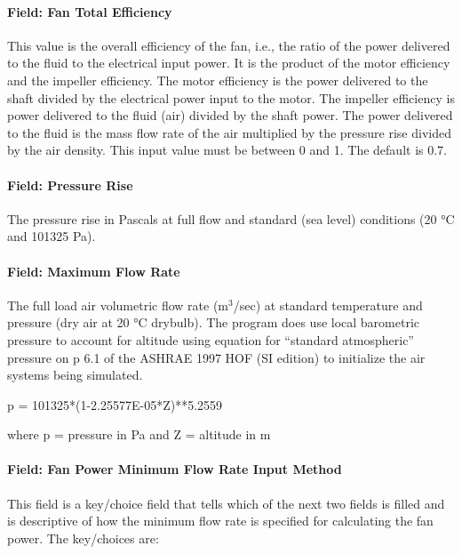 \paragraph{Field: Fan Total Efficiency}\label{field-fan-total-efficiency-2}

This value is the overall efficiency of the fan, i.e., the ratio of the power delivered to the fluid to the electrical input power. It is the product of the motor efficiency and the impeller efficiency. The motor efficiency is the power delivered to the shaft divided by the electrical power input to the motor. The impeller efficiency is power delivered to the fluid (air) divided by the shaft power. The power delivered to the fluid is the mass flow rate of the air multiplied by the pressure rise divided by the air density. This input value must be between 0 and 1. The default is 0.7.

\paragraph{Field: Pressure Rise}\label{field-pressure-rise-2}

The pressure rise in Pascals at full flow and standard (sea level) conditions (20 °C and 101325 Pa).

\paragraph{Field: Maximum Flow Rate}\label{field-maximum-flow-rate-2}

The full load air volumetric flow rate (m\(^{3}\)/sec) at standard temperature and pressure (dry air at 20 °C drybulb). The program does use local barometric pressure to account for altitude using equation for ``standard atmospheric'' pressure on p 6.1 of the ASHRAE 1997 HOF (SI edition) to initialize the air systems being simulated.

p = 101325*(1-2.25577E-05*Z)**5.2559

where p = pressure in Pa and Z = altitude in m

\paragraph{Field: Fan Power Minimum Flow Rate Input Method}\label{field-fan-power-minimum-flow-rate-input-method}

This field is a key/choice field that tells which of the next two fields is filled and is descriptive of how the minimum flow rate is specified for calculating the fan power. The key/choices are:

